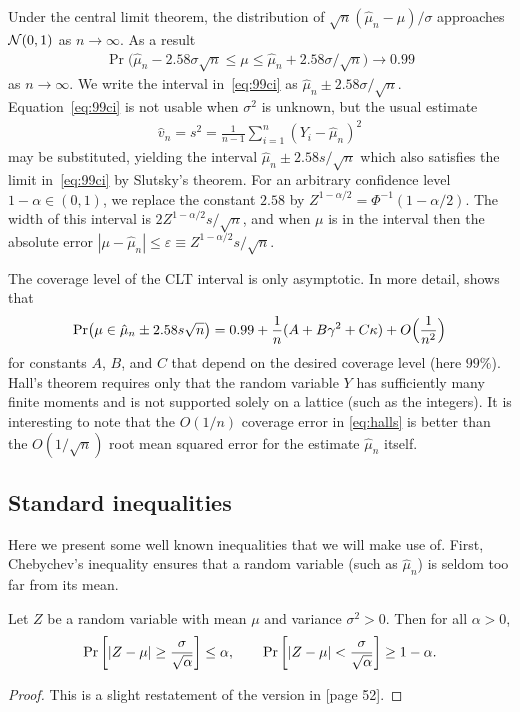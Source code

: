 \documentclass{article}
\begin{document}
Under the central limit theorem,
the distribution of $\sqrt{n}(\hat\mu_n-\mu)/\sigma$
approaches $\mathcal{N}(0,1)$ 
as $n\to\infty$.
As a result
\begin{align}\label{eq:99ci}
\Pr\bigl(
\hat\mu_n-2.58\sigma\sqrt{n}
\le \mu\le
\hat\mu_n+2.58\sigma/\sqrt{n}\bigr)
\to 0.99
\end{align}
as $n\to\infty$.
We write the interval in~\eqref{eq:99ci}
as $\hat\mu_n\pm 2.58\sigma/\sqrt{n}$.
Equation~\eqref{eq:99ci} is not usable when
$\sigma^2$ is unknown, but the usual estimate
\begin{align}\label{eq:samplevar}
\hat v_n = s^2 = \frac1{n-1}\sum_{i=1}^n(Y_i-\hat\mu_n)^2
\end{align}
may be substituted, yielding the interval
$\hat\mu_n\pm2.58s/\sqrt{n}$ which also
satisfies the limit in~\eqref{eq:99ci}
by Slutsky's theorem. For an arbitrary
confidence level $1-\alpha\in(0,1)$, we replace
the constant $2.58$ by $Z^{1-\alpha/2}=\Phi^{-1}(1-\alpha/2)$.
The width of this interval is
$2Z^{1-\alpha/2}s/\sqrt{n}$, and when $\mu$ is in
the interval then the absolute error
$|\mu-\hat\mu_n|\le 
\varepsilon\equiv Z^{1-\alpha/2}s/\sqrt{n}$.


The coverage level of the CLT interval is only asymptotic. In
more detail, \cite{hall:1986} shows that
\begin{align}\label{eq:halls}
\Pr\bigl(
\mu \in 
\hat\mu_n\pm2.58 s\sqrt{n}
\bigr)
= 0.99 + \frac1n(A + B\gamma^2+C\kappa) + O\Bigl(\frac1{n^2}\Bigr)
\end{align}
for constants $A$, $B$, and $C$ that depend
on the desired coverage level (here $99$\%).  Hall's theorem
requires only that the random variable $Y$ has sufficiently
many finite moments
and is not supported solely on a lattice (such as
the integers).
It is interesting to note that the $O(1/n)$ coverage error in
\eqref{eq:halls} is better than the $O(1/\sqrt{n})$
root mean squared error for the estimate $\hat\mu_n$ itself.


\subsection{Standard inequalities}

Here we present some well known inequalities
that we will make use of.
First, Chebychev's inequality ensures that
a random variable (such as $\hat\mu_n$) is
seldom too far from its mean.

\begin{theorem} \label{Chebineqthm} Let $Z$ be a random variable with mean $\mu$ and variance $\sigma^2>0$.  
Then for all $\alpha >0$,
\[
\Pr\left[\left|Z-\mu\right| \ge \frac{\sigma}{\sqrt{\alpha}} \right] \le \alpha, \qquad \Pr\left[\left|Z-\mu\right| < \frac{\sigma}{\sqrt{\alpha}} \right] \ge 1-\alpha.
\]
\end{theorem}
\begin{proof}
This is a slight restatement of the
version in 
\cite{lin:bai:2011}[page 52].
\end{proof}
\end{document}
